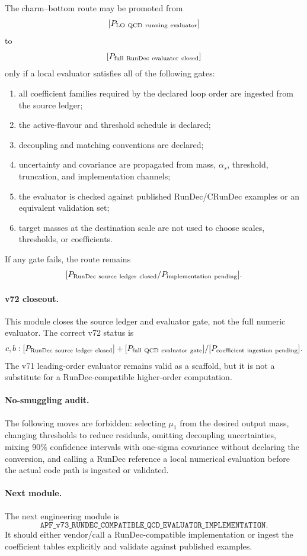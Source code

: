 \begin{theorem}
\label{thm:full-qcd-evaluator-gate-v72}
The charm--bottom route may be promoted from
\[
  [P_{\rm LO\ QCD\ running\ evaluator}]
\]
to
\[
  [P_{\rm full\ RunDec\ evaluator\ closed}]
\]
only if a local evaluator satisfies all of the following gates:
\begin{enumerate}
\item all coefficient families required by the declared loop order are ingested from the source ledger;
\item the active-flavour and threshold schedule is declared;
\item decoupling and matching conventions are declared;
\item uncertainty and covariance are propagated from mass, $\alpha_s$, threshold, truncation, and implementation channels;
\item the evaluator is checked against published RunDec/CRunDec examples or an equivalent validation set;
\item target masses at the destination scale are not used to choose scales, thresholds, or coefficients.
\end{enumerate}
If any gate fails, the route remains
\[
  [P_{\rm RunDec\ source\ ledger\ closed}/P_{\rm implementation\ pending}].
\]
\end{theorem}

\paragraph{v72 closeout.}
This module closes the source ledger and evaluator gate, not the full numeric evaluator.  The correct v72 status is
\[
  c,b:
  [P_{\rm RunDec\ source\ ledger\ closed}]
  +[P_{\rm full\ QCD\ evaluator\ gate}]
  /[P_{\rm coefficient\ ingestion\ pending}].
\]
The v71 leading-order evaluator remains valid as a scaffold, but it is not a substitute for a RunDec-compatible higher-order computation.

\paragraph{No-smuggling audit.}
The following moves are forbidden: selecting $\mu_1$ from the desired output mass, changing thresholds to reduce residuals, omitting decoupling uncertainties, mixing 90\% confidence intervals with one-sigma covariance without declaring the conversion, and calling a RunDec reference a local numerical evaluation before the actual code path is ingested or validated.

\paragraph{Next module.}
The next engineering module is
\[
  \texttt{APF\_v73\_RUNDEC\_COMPATIBLE\_QCD\_EVALUATOR\_IMPLEMENTATION}.
\]
It should either vendor/call a RunDec-compatible implementation or ingest the coefficient tables explicitly and validate against published examples.
